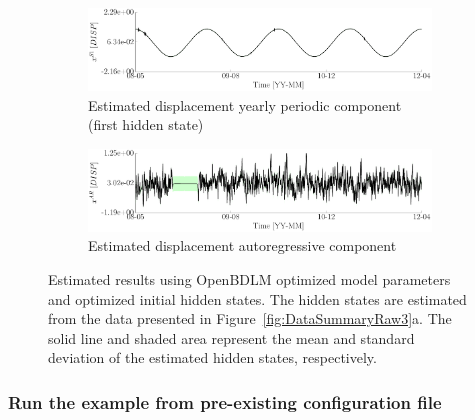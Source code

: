 \begin{figure}[htbp]
\ContinuedFloat
\begin{subfigure}{\linewidth}\centering
\includegraphics[width=0.9\linewidth]{./docfigs/Example_DISPSIM_ANOMALY/optim_param_optim_initialhiddenstate/DISP_S1_4.pdf}
\caption{Estimated displacement yearly periodic component (first hidden state)}
\end{subfigure}
\begin{subfigure}{\linewidth}\centering
\includegraphics[width=0.9\linewidth]{./docfigs/Example_DISPSIM_ANOMALY/optim_param_optim_initialhiddenstate/DISP_AR_6.pdf} 
\caption{Estimated displacement autoregressive component}
\end{subfigure}
\caption{Estimated results using OpenBDLM optimized model parameters and optimized initial hidden states. The hidden states are estimated from the data presented in Figure~\ref{fig:DataSummaryRaw3}a. The solid line and shaded area represent the mean and standard deviation of the estimated hidden states, respectively.}
\label{fig:DISPSIMANOMALYOptimizedOptimizedExample3}
\end{figure}



\subsubsection{Run the example from pre-existing configuration file}
\label{SS:LoadConfigFileEx3}

